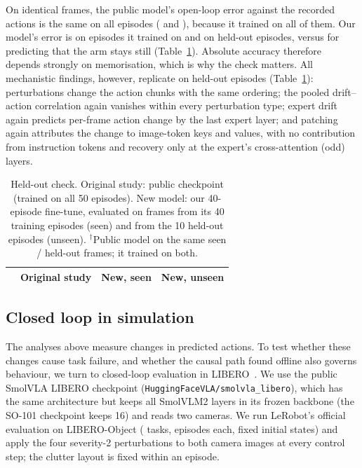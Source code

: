 \documentclass[conference]{IEEEtran}
\begin{document}
On identical frames, the public model's open-loop error against the recorded actions is the same on all episodes (\HoOrigBoth{} and \HoOrigHeld{}), because it trained on all of them. Our model's error is \HoNewSeen{} on episodes it trained on and \HoNewHeld{} on held-out episodes, versus \HoStillHeld{} for predicting that the arm stays still (Table~\ref{tab:heldout}). Absolute accuracy therefore depends strongly on memorisation, which is why the check matters. All mechanistic findings, however, replicate on held-out episodes (Table~\ref{tab:heldout}): perturbations change the action chunks with the same ordering; the pooled drift--action correlation again vanishes within every perturbation type; expert drift again predicts per-frame action change by the last expert layer; and patching again attributes the change to image-token keys and values, with no contribution from instruction tokens and recovery only at the expert's cross-attention (odd) layers.

\begin{table}[t]
\centering\small
\caption{Held-out check. Original study: public checkpoint (trained on all 50 episodes). New model: our 40-episode fine-tune, evaluated on frames from its 40 training episodes (seen) and from the 10 held-out episodes (unseen). $^\dagger$Public model on the same seen / held-out frames; it trained on both.}
\label{tab:heldout}
\setlength{\tabcolsep}{3pt}
\begin{tabular}{lccc}
\toprule
 & Original study & New, seen & New, unseen \\
\midrule

\end{tabular}
\end{table}


\subsection{Closed loop in simulation}\label{sec:libero}
The analyses above measure changes in predicted actions. To test whether these changes cause task failure, and whether the causal path found offline also governs behaviour, we turn to closed-loop evaluation in LIBERO~\cite{liu2023libero}. We use the public SmolVLA LIBERO checkpoint (\nolinkurl{HuggingFaceVLA/smolvla_libero}), which has the same architecture but keeps all \LmLayers{} SmolVLM2 layers in its frozen backbone (the SO-101 checkpoint keeps 16) and reads two cameras. We run LeRobot's official evaluation on LIBERO-Object (\LbTasks{} tasks, \LbEps{} episodes each, fixed initial states) and apply the four severity-2 perturbations to both camera images at every control step; the clutter layout is fixed within an episode.
\end{document}
